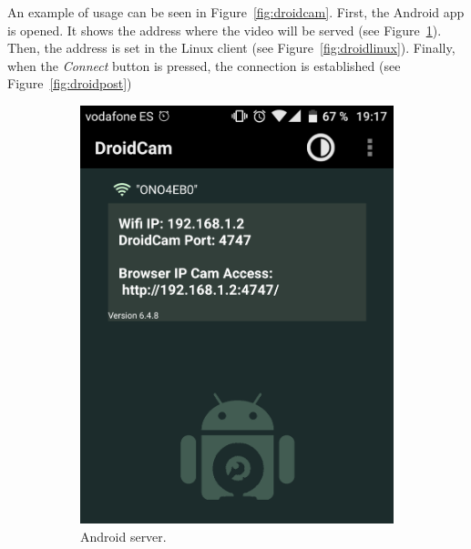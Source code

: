 An example of usage can be seen in Figure~\ref{fig:droidcam}. First, the Android app is opened. It shows the address where the video will be served (see Figure~\ref{fig:droidpre}). Then, the address is set in the Linux client (see Figure~\ref{fig:droidlinux}). Finally, when the \textit{Connect} button is pressed, the connection is established (see Figure~\ref{fig:droidpost})
\begin{figure}
	\centering
	\begin{subfigure}{0.33\textwidth}
		\centering
		\includegraphics[width=0.9\linewidth]{figures/droidcampre.png}
		\caption{Android server.}
		\label{fig:droidpre}
	\end{subfigure}%
	\begin{subfigure}{0.33\textwidth}
		\centering

\end{subfigure}
\end{figure}

